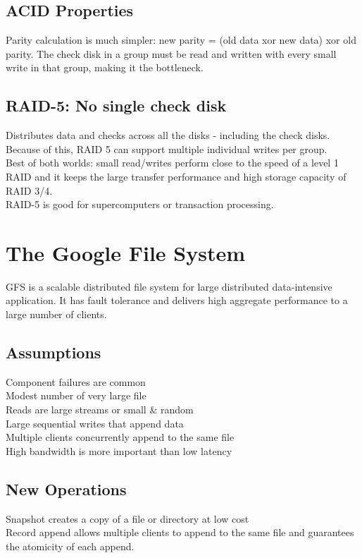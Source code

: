 \subsection{ACID Properties}
Parity calculation is much simpler: new parity = (old data xor new data) xor old parity. The check disk in a group must be read and written with every small write in that group, making it the bottleneck.
\subsection{RAID-5: No single check disk}
Distributes data and checks across all the disks - including the check disks. Because of this, RAID 5 can support multiple individual writes per group.\\
Best of both worlds: small read/writes perform close to the speed of a level 1 RAID and it keeps the large transfer performance and high storage capacity of RAID 3/4.\\
RAID-5 is good for supercomputers or transaction processing.


\section{The Google File System}
GFS is a scalable distributed file system for large distributed data-intensive application. It has fault tolerance and delivers high aggregate performance to a large number of clients.
\subsection{Assumptions}
Component failures are common\\
Modest number of very large file\\
Reads are large streams or small \& random\\
Large sequential writes that append data\\
Multiple clients concurrently append to the same file \\
High bandwidth is more important than low latency\\
\subsection{New Operations}
Snapshot creates a copy of a file or directory at low cost\\
Record append allows multiple clients to append to the same file and guarantees the atomicity of each append.
